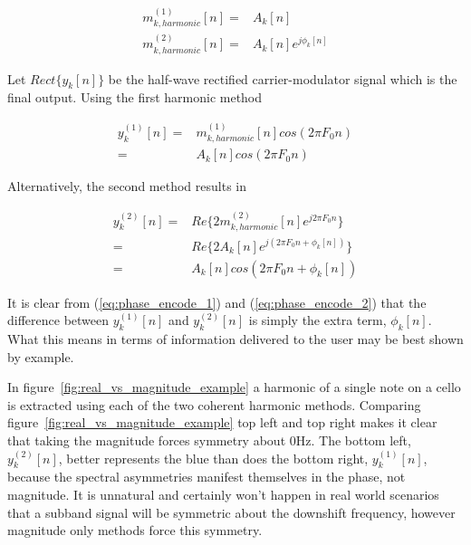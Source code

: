 \documentclass [11pt, proquest,oneside] {ganter_thesis}[2015/03/03]
\begin{document}
\begin{align}
\label{eq:realVSmag1}
m^{(1)}_{k,harmonic}[n] =& A_k[n] \\
m^{(2)}_{k,harmonic}[n] =& A_k[n]e^{j\phi_k[n]}
\end{align}

Let $Rect\{y_k[n]\}$ be the half-wave rectified carrier-modulator signal which is the final output.  Using the first harmonic method

\begin{align}
y_k^{(1)}[n] =& m^{(1)}_{k,harmonic}[n] cos(2\pi F_0 n) \nonumber \\
\label{eq:phase_encode_1}
=& A_k[n] cos(2\pi F_0 n)
\end{align}

Alternatively, the second method results in

\begin{align}
y_k^{(2)}[n] =& Re\{ 2m^{(2)}_{k,harmonic}[n] e^{j2\pi F_0 n} \} \nonumber  \\
=& Re\{ 2A_k[n]e^{j(2\pi F_0 n + \phi_k[n])} \} \nonumber \\
\label{eq:phase_encode_2}
=& A_k[n]cos(2\pi F_0 n + \phi_k[n])
\end{align}

It is clear from (\ref{eq:phase_encode_1}) and (\ref{eq:phase_encode_2}) that the difference between $y_k^{(1)}[n]$ and $y_k^{(2)}[n]$ is simply the extra term, $\phi_k[n]$.  What this means in terms of information delivered to the user may be best shown by example.

In figure~\ref{fig:real_vs_magnitude_example} a harmonic of a single note on a cello is extracted using each of the two coherent harmonic methods.  Comparing figure~\ref{fig:real_vs_magnitude_example} top left and top right makes it clear that taking the magnitude forces symmetry about $0$Hz.  The bottom left, $y_k^{(2)}[n]$, better represents the blue than does the bottom right, $y_k^{(1)}[n]$, because the spectral asymmetries manifest themselves in the phase, not magnitude.  It is unnatural and certainly won't happen in real world scenarios that a subband signal will be symmetric about the downshift frequency, however magnitude only methods force this symmetry.
\end{document}
